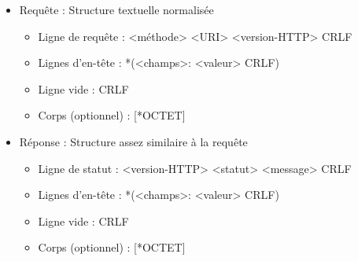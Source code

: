 \documentclass[11pt,twoside,a4paper]{article}
\begin{document}
\begin{landscape}
\begin{multicols}{2}
\begin{itemize}
		\item Requ{\^e}te : Structure textuelle normalis{\'e}e
		\begin{itemize}
			\item Ligne de requ{\^e}te : <m{\'e}thode> <URI> <version-HTTP> CRLF
			\item Lignes d'en-t{\^e}te : *(<champs>: <valeur> CRLF)
			\item Ligne vide : CRLF
			\item Corps (optionnel) : [*OCTET]
		\end{itemize}
		\item R{\'e}ponse : Structure assez similaire {\`a} la requ{\^e}te
		\begin{itemize}
			\item Ligne de statut : <version-HTTP> <statut> <message> CRLF
			\item Lignes d'en-t{\^e}te : *(<champs>: <valeur> CRLF)
			\item Ligne vide : CRLF
			\item Corps (optionnel) : [*OCTET]
		\end{itemize}
	\end{itemize}
	
	\columnbreak
	

\end{multicols}
\end{landscape}
\end{document}
